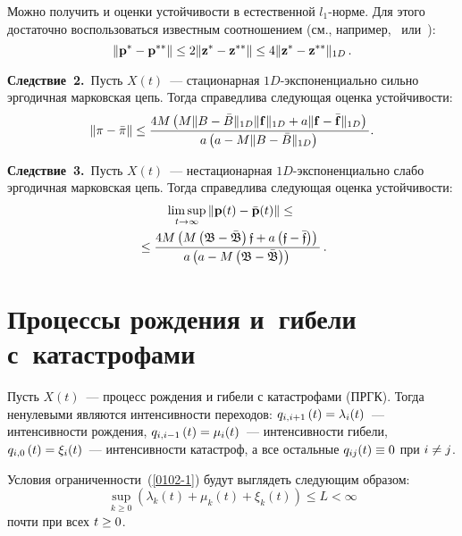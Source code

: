 \begin{multicols}{2}
\medskip

Можно получить и оценки устойчивости в естественной $l_1$-нор\-ме.
Для этого достаточно воспользоваться известным соотношением
(см., например,~\cite{gz04} или~\cite{z06}):
$$\|{\mathbf p}^*-{\mathbf p}^{**}\| \le 2 \|{\mathbf z}^*-{\mathbf z}^{**}\| \le 4\|{\mathbf z}^*-{\mathbf z}^{**}\|_{1D}\,.
$$


\medskip

\noindent
\textbf{Следствие~2.}\
Пусть  $X(t)$~--- стационарная $1D$-экс\-по\-нен\-ци\-аль\-но
сильно эргодичная марковская цепь. Тогда справедлива следующая оценка устойчи\-вости:
\begin{equation*}
 \|{\bf \pi}- {\bar{\bf \pi}}\| \le
\displaystyle\frac{\displaystyle 4M\left(M\| B -\bar{B}\|_{1D} \|{\bf f}\|_{1D}  + a\|{\mathbf f} -\bar{{\mathbf f}}\|_{1D}\right)\mathstrut}{\displaystyle a\left(a - M\|B -\bar{B}\|_{1D}\right)\mathstrut}.
\end{equation*}

\medskip

\noindent
\textbf{Следствие~3.}\
Пусть  $X(t)$~--- нестационарная  $1D$-экс\-по\-нен\-ци\-аль\-но слабо
эргодичная марковская цепь. Тогда справедлива следующая оценка устойчи\-вости:
\begin{multline*}
\limsup\limits_{t \to \infty}   \|{\bf p}(t)- {\bar{\bf p}}(t)\| \le{}\\
{}\le
\displaystyle\frac{\displaystyle 4M\left(M\left(\mathfrak{B-\bar{B}}\right) \mathfrak{f}  + a\left(\mathfrak{f-\bar{f}}\right)\right)\mathstrut}{\displaystyle a\left(a - M\left(\mathfrak{B-\bar{B}}\right)\right)\mathstrut}\,.
\end{multline*}

\section{Процессы рождения и~гибели с~катастрофами}

Пусть $X(t)$~--- процесс рождения и гибели с катастрофами (ПРГК).
Тогда ненулевыми являются интенсивности
переходов: $q_{i,i+1}\left( t\right)\hm=\lambda_i(t)$~--- интенсивности рождения,
$q_{i,i-1}\left(t\right) \hm= \mu_i(t)$~---
интенсивности гибели,  $q_{i,0}\left( t\right) \hm=\xi_i(t)$~---
интенсивности катастроф,  а все остальные $q_{ij}(t)\hm \equiv 0$ при $i\hm \neq j$.

Условия ограниченности~(\ref{0102-1}) будут выглядеть следующим образом:
\begin{equation*}
\sup\limits_{k \ge 0} \left(\lambda _k(t) +\mu_{k}(t) +\xi_{k}(t)\right) \le L < \infty
\end{equation*}
\noindent почти при всех $t \hm\ge 0$.


\end{multicols}
